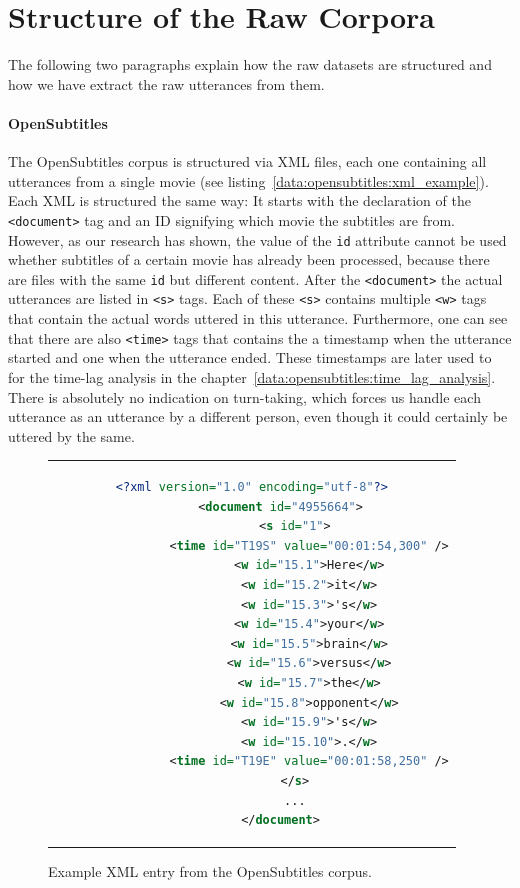 \section{Structure of the Raw Corpora}
\label{data:structure_of_corpora}
The following two paragraphs explain how the raw datasets are structured and how we have extract the raw utterances from them.

\paragraph{OpenSubtitles} The OpenSubtitles corpus is structured via XML files, each one containing all utterances from a single movie (see listing~\ref{data:opensubtitles:xml_example}). Each XML is structured the same way: It starts with the declaration of the \texttt{<document>} tag and an ID signifying which movie the subtitles are from. However, as our research has shown, the value of the \texttt{id} attribute cannot be used whether subtitles of a certain movie has already been processed, because there are files with the same \texttt{id} but different content. After the \texttt{<document>} the actual utterances are listed in \texttt{<s>} tags. Each of these \texttt{<s>} contains multiple \texttt{<w>} tags that contain the actual words uttered in this utterance. Furthermore, one can see that there are also \texttt{<time>} tags that contains the a timestamp when the utterance started and one when the utterance ended. These timestamps are later used to for the time-lag analysis in the chapter~\ref{data:opensubtitles:time_lag_analysis}. There is absolutely no indication on turn-taking, which forces us handle each utterance as an utterance by a different person, even though it could certainly be uttered by the same.\\


\begin{figure}[thp]
	\centering
	\begin{tabular}{c}  %
		\begin{lstlisting}[language=XML,label=data:opensubtitles:xml_example]
		<?xml version="1.0" encoding="utf-8"?>
		<document id="4955664">
			<s id="1">
				<time id="T19S" value="00:01:54,300" />
				<w id="15.1">Here</w>
				<w id="15.2">it</w>
				<w id="15.3">'s</w>
				<w id="15.4">your</w>
				<w id="15.5">brain</w>
				<w id="15.6">versus</w>
				<w id="15.7">the</w>
				<w id="15.8">opponent</w>
				<w id="15.9">'s</w>
				<w id="15.10">.</w>
				<time id="T19E" value="00:01:58,250" />
			</s>
			...
		</document>
		\end{lstlisting}
	\end{tabular}
	\caption{Example XML entry from the OpenSubtitles corpus.}
\end{figure}

